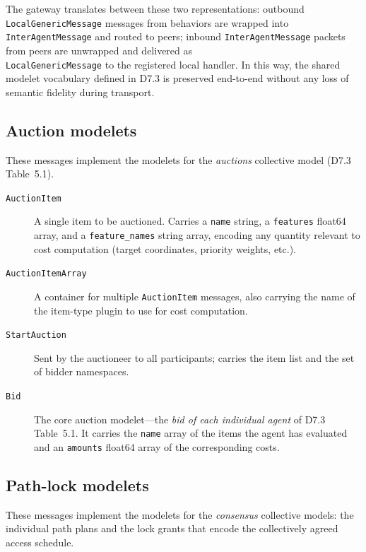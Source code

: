 \documentclass[deliverable]{csreport}
\renewcommand{\code}[1]{\texttt{\textcolor{CSMaroon}{#1}}}%
\newcommand{\tcode}[1]{\texttt{\textcolor{CSMaroon}{#1}}}
\begin{document}
The gateway translates between these two representations: outbound \code{LocalGenericMessage} messages from behaviors are wrapped into \code{InterAgentMessage} and routed to peers; inbound \code{InterAgentMessage} packets from peers are unwrapped and delivered as \\ \code{LocalGenericMessage} to the registered local handler. In this way, the shared modelet vocabulary defined in D7.3 is preserved end-to-end without any loss of semantic fidelity during transport.

\subsection{Auction modelets}

These messages implement the modelets for the \emph{auctions} collective model (D7.3 Table~5.1).

\begin{description}
  \item[\tcode{AuctionItem}] A single item to be auctioned. Carries a \code{name} string, a \code{features} float64 array, and a \code{feature\_names} string array, encoding any quantity relevant to cost computation (target coordinates, priority weights, etc.).
  \item[\tcode{AuctionItemArray}] A container for multiple \code{AuctionItem} messages, also carrying the name of the item-type plugin to use for cost computation.
  \item[\tcode{StartAuction}] Sent by the auctioneer to all participants; carries the item list and the set of bidder namespaces.
  \item[\tcode{Bid}] The core auction modelet---the \emph{bid of each individual agent} of D7.3 Table~5.1. It carries the \code{name} array of the items the agent has evaluated and an \code{amounts} float64 array of the corresponding costs.
\end{description}

\subsection{Path-lock modelets}

These messages implement the modelets for the \emph{consensus} collective models: the individual path plans and the lock grants that encode the collectively agreed access schedule.
\end{document}
